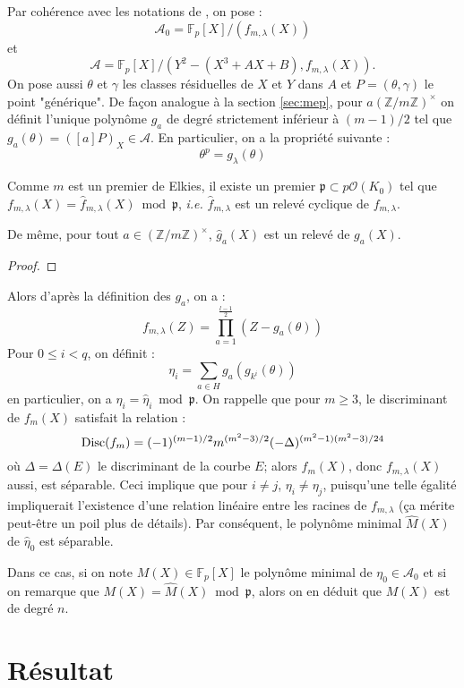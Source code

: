 \documentclass[a4paper]{article} %
\newcommand\zmodninv[1]{(\mathbb{Z}/#1\mathbb{Z})^{\times}}
\newcommand\GF[1]{\mathbb{F}_{#1}}
\newcommand\EO{\mathcal{O}}
\begin{document}
Par cohérence avec les notations de \cite{MiMoSch}, on pose :
\[
\mathcal{A}_0 = \GF{p}[X]/(f_{m,\lambda}(X))
\]
et
\[
\mathcal{A} = \GF{p}[X]/(Y^2 - (X^3 + AX + B), f_{m,\lambda}(X)).
\]
On pose aussi $\theta$ et $\gamma$ les classes résiduelles de $X$ et $Y$ dans
$A$ et $P = (\theta, \gamma)$ le point "générique". De façon analogue à la
section \ref{sec:mep}, pour $a\zmodninv{m}$ on définit l'unique polynôme $g_a$ de degré
strictement inférieur à $(m-1)/2$ tel que $g_a(\theta) = ([a]P)_X \in
\mathcal{A}$. En particulier, on a la propriété suivante :
\[
\theta^p = g_{\lambda}(\theta)
\]
\begin{fac}
Comme $m$ est un premier de Elkies, il existe un premier $\mathfrak{p} \subset
p\EO(K_0)$ tel que $f_{m,\lambda}(X) = \widehat{f}_{m,\lambda}(X) \bmod
\mathfrak{p}$, \emph{i.e.} $\widehat{f}_{m,\lambda}$ est un relevé cyclique de
$f_{m,\lambda}$.\par
De même, pour tout $a\in\zmodninv{m}$, $\widehat{g}_a(X)$ est un relevé de
$g_a(X)$.
\end{fac}
\begin{proof}
\end{proof}
Alors d'après la définition des $g_a$, on a :
\[
f_{m,\lambda}(Z) = \prod_{a=1}^{\tfrac{l-1}{2}}{(Z - g_a(\theta))}
\]
Pour $0 \leq i < q$, on définit : 
\[
\eta_i = \sum_{a\in H}{g_a(g_{k^i}(\theta))}
\]
en particulier, on a $\eta_i = \widehat{\eta}_i \bmod \mathfrak{p}$. On rappelle
que pour $m\geq3$, le discriminant de $f_m(X)$ satisfait la relation :
\[
\textup{Disc}(f_m) = (-1)^{(m-1)/2}m^{(m^2 - 3)/2}(-\Delta)^{(m^2 - 1)(m^2 -
3)/24}
\]
où $\Delta = \Delta(E)$ le discriminant de la courbe $E$; alors $f_m(X)$, donc
$f_{m,\lambda}(X)$ aussi, est séparable. Ceci implique que pour $i\neq j$,
$\eta_i\neq\eta_j$, puisqu'une telle égalité impliquerait l'existence d'une
relation linéaire entre les racines de $f_{m,\lambda}$ (ça mérite peut-être un
poil plus de détails). Par conséquent, le polynôme minimal $\widehat{M}(X)$ de
$\widehat{\eta}_0$ est séparable.\par
Dans ce cas, si on note $M(X)\in\GF{p}[X]$ le polynôme minimal de
$\eta_0\in\mathcal{A}_0$ et si on remarque que $M(X) = \widehat{M}(X)\bmod
\mathfrak{p}$, alors on en déduit que $M(X)$ est de degré $n$.

\section{Résultat}
\end{document}
